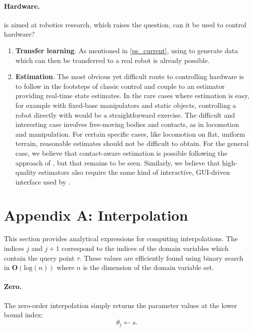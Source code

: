 \paragraph{Hardware.} \app{} is aimed at robotics research, which raises the question, can it be used to control hardware?
\begin{enumerate}
	\item \textbf{Transfer learning}. As mentioned in \ref{ps_current}, using \app{} to generate data which can then be transferred to a real robot is already possible.
	\item \textbf{Estimation}. The most obvious yet difficult route to controlling hardware is to follow in the footsteps of classic control and couple \app{} to an estimator providing real-time state estimates. In the rare cases where estimation is easy, for example with fixed-base manipulators and static objects, controlling a robot directly with \app{} would be a straightforward exercise. The difficult and interesting case involves free-moving bodies and contacts, as in locomotion and manipulation. For certain specific cases, like locomotion on flat, uniform terrain, reasonable estimates should not be difficult to obtain. For the general case, we believe that contact-aware estimation is possible following the approach of \cite{lowrey2014physically}, but that remains to be seen. Similarly, we believe that high-quality estimators also require the same kind of interactive, GUI-driven interface used by \app{}.
\end{enumerate}

\section{Appendix A: Interpolation}
This section provides analytical expressions for computing interpolations. The indices $j$ and $j+1$ correspond to the indices of the domain variables which contain the query point $\tau$. These values are efficiently found using binary search in $\mathbf{O}\left(\text{log}(n)\right)$ where $n$ is the dimension of the domain variable set.

\paragraph{Zero.}
The zero-order interpolation simply returns the parameter values at the lower bound index:
\begin{equation}
	\theta_j \leftarrow s.
\end{equation}

